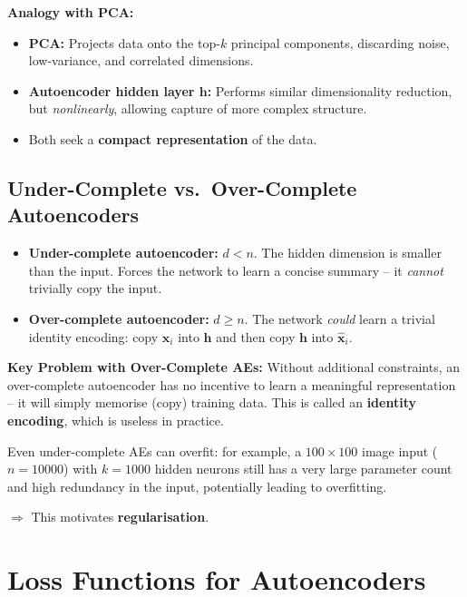 \documentclass[12pt,a4paper]{article}
\newcommand{\vx}{\mathbf{x}}
\newcommand{\vh}{\mathbf{h}}
\newcommand{\hatx}{\hat{\mathbf{x}}}
\begin{document}
\textbf{Analogy with PCA:}
\begin{itemize}
  \item \textbf{PCA:} Projects data onto the top-$k$ principal components, discarding noise, low-variance, and correlated dimensions.
  \item \textbf{Autoencoder hidden layer $\vh$:} Performs similar dimensionality reduction, but \emph{nonlinearly}, allowing capture of more complex structure.
  \item Both seek a \textbf{compact representation} of the data.
\end{itemize}

\subsection{Under-Complete vs.\ Over-Complete Autoencoders}

\begin{defbox}
\begin{itemize}
  \item \textbf{Under-complete autoencoder:} $d < n$. The hidden dimension is smaller than the input. Forces the network to learn a concise summary -- it \emph{cannot} trivially copy the input.
  \item \textbf{Over-complete autoencoder:} $d \geq n$. The network \emph{could} learn a trivial identity encoding: copy $\vx_i$ into $\vh$ and then copy $\vh$ into $\hatx_i$.
\end{itemize}
\end{defbox}

\begin{alertbox}
\textbf{Key Problem with Over-Complete AEs:} Without additional constraints, an over-complete autoencoder has no incentive to learn a meaningful representation -- it will simply memorise (copy) training data. This is called an \textbf{identity encoding}, which is useless in practice.

Even under-complete AEs can overfit: for example, a $100\times100$ image input ($n=10000$) with $k=1000$ hidden neurons still has a very large parameter count and high redundancy in the input, potentially leading to overfitting.

$\Rightarrow$ This motivates \textbf{regularisation}.
\end{alertbox}

\section{Loss Functions for Autoencoders}
\end{document}
